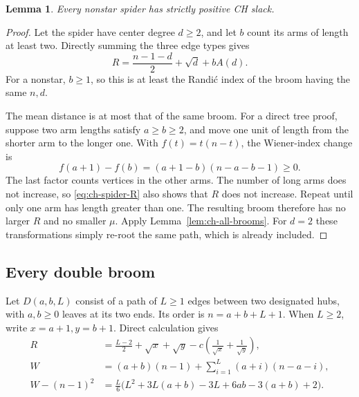 \documentclass[11pt,a4paper]{article}
\newtheorem{lemma}[theorem]{Lemma}
\theoremstyle{remark}\newtheorem{remark}[theorem]{Remark}
\begin{document}
\begin{lemma}\label{lem:ch-all-spiders}
Every nonstar spider has strictly positive CH slack.
\end{lemma}
\begin{proof}
Let the spider have center degree $d\ge2$, and let $b$ count its arms
of length at least two. Directly summing the three edge types gives
\begin{equation}\label{eq:ch-spider-R}
 R=\frac{n-1-d}{2}+\sqrt d+bA(d).
\end{equation}
For a nonstar, $b\ge1$, so this is at least the Randi\'c index of the
broom having the same $n,d$.

The mean distance is at most that of the same broom. For a direct tree
proof, suppose two arm lengths satisfy $a\ge b\ge2$, and move one unit
of length from the shorter arm to the longer one. With $f(t)=t(n-t)$,
the Wiener-index change is
\[
 f(a+1)-f(b)=(a+1-b)(n-a-b-1)\ge0.
\]
The last factor counts vertices in the other arms. The number of long
arms does not increase, so \eqref{eq:ch-spider-R} also shows that $R$
does not increase. Repeat until only one arm has length greater than one.
The resulting broom therefore has no larger $R$ and no smaller $\mu$.
Apply Lemma~\ref{lem:ch-all-brooms}. For $d=2$ these transformations simply
re-root the same path, which is already included.
\end{proof}

\subsection{Every double broom}
Let $D(a,b,L)$ consist of a path of $L\ge1$ edges between two designated
hubs, with $a,b\ge0$ leaves at its two ends. Its order is
$n=a+b+L+1$. When $L\ge2$, write $x=a+1,y=b+1$. Direct calculation gives
\begin{align}
 R&=\frac{L-2}{2}+\sqrt x+\sqrt y
                  -c\left(\frac1{\sqrt x}+\frac1{\sqrt y}\right),
                  \label{eq:ch-db-R}\\
 W&=(a+b)(n-1)+\sum_{i=1}^L(a+i)(n-a-i),\label{eq:ch-db-W}\\
 W-(n-1)^2&=\frac L6
 \bigl(L^2+3L(a+b)-3L+6ab-3(a+b)+2\bigr).
 \label{eq:ch-db-excess}
\end{align}
\end{document}
